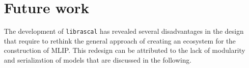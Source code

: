 



\section{Future work}
The development of \texttt{librascal} has revealed several disadvantages in the design that require to rethink the general approach of creating an ecosystem for the construction of MLIP.
This redesign can be attributed to the lack of modularity and serialization of models that are discussed in the following. 

